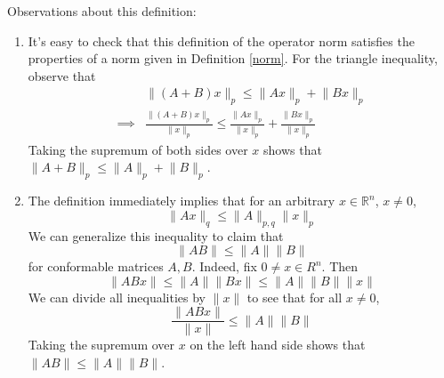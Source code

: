 \documentclass[12pt]{article}
\theoremstyle{definition}
\newcommand{\norm}[1]{\lVert#1\rVert}
\theoremstyle{definition}
\begin{document}
Observations about this definition:
\begin{enumerate}
	\item It's easy to check that this definition of the operator norm satisfies the properties of a norm given in Definition \ref{norm}. For the triangle inequality, observe that
	\begin{align*}
		&\norm{(A + B)x}_p \leq \norm{Ax}_p + \norm{Bx}_p \tag{from Minkowski's inequality} \\
		\implies & \frac{\norm{(A + B)x}_p}{\norm{x}_p} \leq \frac{\norm{Ax}_p}{\norm{x}_p} + \frac{\norm{Bx}_p}{\norm{x}_p}
	\end{align*}
	Taking the supremum of both sides over $x$ shows that $\norm{A + B}_p \leq \norm{A}_p + \norm{B}_p$.
	\item The definition immediately implies that for an arbitrary $x \in \mathbb{R}^n$, $x \neq 0$, 
	\begin{equation}
		\norm{Ax}_q \leq \norm{A}_{p,q} \norm{x}_p
	\end{equation}
	We can generalize this inequality to claim that
	\begin{equation}
		\norm{AB} \leq \norm{A} \norm{B}
	\end{equation}
	for conformable matrices $A, B$. Indeed, fix $0 \neq x \in R^n$. Then
	\begin{equation}
		\norm{ABx} \leq \norm{A} \norm{Bx} \leq \norm{A}\norm{B}\norm{x}
	\end{equation}
	We can divide all inequalities by $\norm{x}$ to see that for all $x \neq 0$,
	\begin{equation}
		\frac{\norm{ABx}}{\norm{x}} \leq \norm{A}\norm{B}
	\end{equation}
	Taking the supremum over $x$ on the left hand side shows that $\norm{AB} \leq \norm{A} \norm{B}$.
\end{enumerate}
\end{document}
